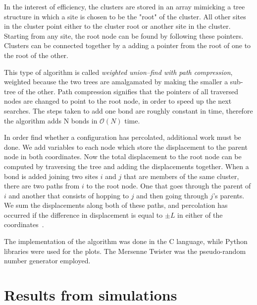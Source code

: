 In the interest of efficiency, the clusters are stored in an array mimicking a tree structure in which a site is chosen to be the "root" of the cluster. All other sites in the cluster point either to the cluster root or another site in the cluster. Starting from any site, the root node can be found by following these pointers. Clusters can be connected together by a adding a pointer from the root of one to the root of the other.

This type of algorithm is called \emph{weighted union–find with path compression}, weighted because the two trees are amalgamated by making the smaller a sub-tree of the other. Path compression signifies that the pointers of all traversed nodes are changed to point to the root node, in order to speed up the next searches. The steps taken to add one bond are roughly constant in time, therefore the algorithm adds N bonds in $\mathcal O(N)$ time.

In order find whether a configuration has percolated, additional work must be done. We add variables to each node which store the displacement to the parent node in both coordinates. Now the total displacement to the root node can be computed by traversing the tree and adding the displacements together. When a bond is added joining two sites $i$ and $j$ that are members of the same cluster, there are two paths from $i$ to the root node. One that goes through the parent of $i$ and another that consists of hopping to $j$ and then going through $j$'s parents. We sum the displacements along both of these paths, and percolation has occurred if the difference in displacement is equal to $\pm L$ in either of the coordinates~\cite{Mertens_2012}. 

The implementation of the algorithm was done in the C language, while Python libraries were used for the plots. The Mersenne Twister was the pseudo-random number generator employed. 

\section{Results from simulations}

